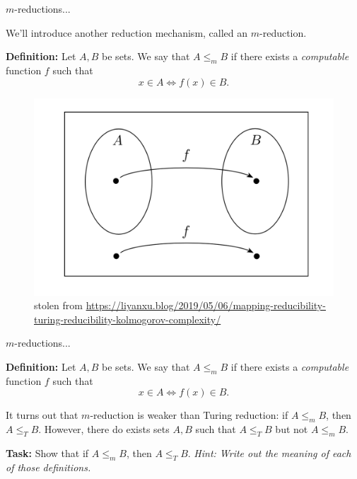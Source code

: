 \documentclass{beamer}
\begin{document}
\begin{frame}{$m$-reductions...}

We'll introduce another reduction mechanism, called an $m$-reduction.

\textbf{Definition:} Let $A, B$ be sets. We say that $A \leq_m B$ if there exists a \textit{computable} function $f$ such that 
$$x \in A \Leftrightarrow f(x) \in B.$$

\begin{figure}[h]
    \centering
    \includegraphics[scale=0.3]{img/mapping_reduc.png}
    \caption*{\tiny{stolen from \url{https://liyanxu.blog/2019/05/06/mapping-reducibility-turing-reducibility-kolmogorov-complexity/}}}
\end{figure}

\end{frame}

\begin{frame}{$m$-reductions...}

\textbf{Definition:} Let $A, B$ be sets. We say that $A \leq_m B$ if there exists a \textit{computable} function $f$ such that 
$$x \in A \Leftrightarrow f(x) \in B.$$

\vspace{2mm}

It turns out that $m$-reduction is weaker than Turing reduction: if $A \leq_m B$, then $A \leq_T B$. However, there do exists sets $A, B$ such that $A \leq_T B$ but not $A \leq_m B$.

\pause
\vspace{2mm}

\textbf{Task:} Show that if $A \leq_m B$, then $A \leq_T B$. \textit{Hint: Write out the meaning of each of those definitions.}

\end{frame}
\end{document}
